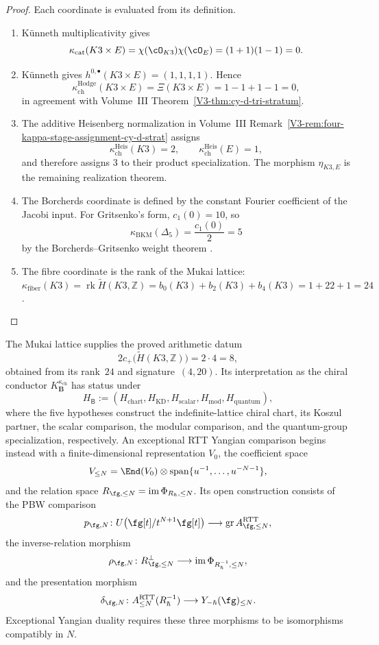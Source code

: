 \begin{proof}
Each coordinate is evaluated from its definition.
\begin{enumerate}[label=\textup{(\roman*)},leftmargin=*]
\item K\"unneth multiplicativity gives
\[
\kappa_{\mathrm{cat}}(K3\times E)
=\chi(\cO_{K3})\chi(\cO_E)
=(1+1)(1-1)=0.
\]
\item K\"unneth gives
\(h^{0,\bullet}(K3\times E)=(1,1,1,1)\).  Hence
\[
\kappa_{\mathrm{ch}}^{\mathrm{Hodge}}(K3\times E)
=\Xi(K3\times E)=1-1+1-1=0,
\]
in agreement with Volume~III
Theorem~\ref{V3-thm:cy-d-tri-stratum}.
\item The additive Heisenberg normalization in Volume~III
Remark~\ref{V3-rem:four-kappa-stage-assignment-cy-d-strat} assigns
\[
\kappa_{\mathrm{ch}}^{\mathrm{Heis}}(K3)=2,\qquad
\kappa_{\mathrm{ch}}^{\mathrm{Heis}}(E)=1,
\]
and therefore assigns \(3\) to their product specialization.
The morphism \(\eta_{K3,E}\) is the remaining realization theorem.
\item The Borcherds coordinate is defined by the constant Fourier
coefficient of the Jacobi input.  For Gritsenko's form,
\(c_1(0)=10\), so
\[
\kappa_{\mathrm{BKM}}(\Delta_5)=\frac{c_1(0)}2=5
\]
by the Borcherds--Gritsenko weight theorem
\cite{Borcherds1998,Gritsenko1999}.
\item The fibre coordinate is the rank of the Mukai lattice:
\[
\kappa_{\mathrm{fiber}}(K3)
=\operatorname{rk}\widetilde H(K3,\mathbb Z)
=b_0(K3)+b_2(K3)+b_4(K3)=1+22+1=24
\]
\cite{Mukai1987}.
\end{enumerate}
\end{proof}

The Mukai lattice supplies the proved arithmetic datum
\[
2c_+\bigl(\widetilde H(K3,\mathbb Z)\bigr)
=2\cdot4=8,
\]
obtained from its rank~$24$ and signature~$(4,20)$.  Its interpretation
as the chiral conductor $K^{\kappa_{\mathrm{ch}}}_{\mathbf B}$ has
status \ClaimStatusConjectured under
\[
H_{\mathsf B}
:=(H_{\mathrm{chart}},H_{\mathrm{KD}},H_{\mathrm{scalar}},
H_{\mathrm{mod}},H_{\mathrm{quantum}}),
\]
where the five hypotheses construct the indefinite-lattice chiral chart,
its Koszul partner, the scalar comparison, the modular comparison, and
the quantum-group specialization, respectively.
An exceptional RTT Yangian comparison begins instead with a
finite-dimensional representation \(V_0\), the coefficient space
\[
V_{\le N}
=\End(V_0)\otimes
\operatorname{span}\{u^{-1},\ldots,u^{-N-1}\},
\]
and the relation space
\(R_{\fg,\le N}=\operatorname{im}\Phi_{R_\hbar,\le N}\).
Its open construction consists of the PBW comparison
\[
p_{\fg,N}\colon
U\bigl(\fg[t]/t^{N+1}\fg[t]\bigr)\longrightarrow
\operatorname{gr}A^{\mathrm{RTT}}_{\fg,\le N},
\]
the inverse-relation morphism
\[
\rho_{\fg,N}\colon
R_{\fg,\le N}^{\perp}
\longrightarrow
\operatorname{im}\Phi_{R_\hbar^{-1},\le N},
\]
and the presentation morphism
\[
\delta_{\fg,N}\colon
A^{\mathrm{RTT}}_{\le N}(R_\hbar^{-1})
\longrightarrow
Y_{-\hbar}(\fg)_{\le N}.
\]
Exceptional Yangian duality requires these three morphisms to be
isomorphisms compatibly in \(N\).

